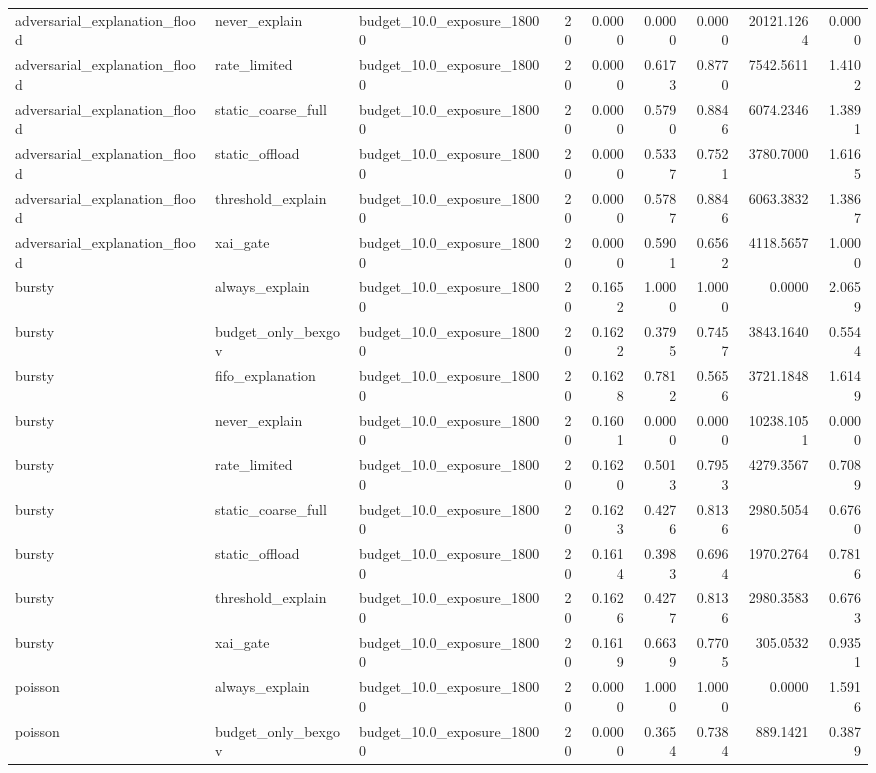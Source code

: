 \begin{table}[t]
\begin{tabular}{lllrrrrrr}
adversarial\_explanation\_flood & never\_explain & budget\_10.0\_exposure\_18000 & 20 & 0.0000 & 0.0000 & 0.0000 & 20121.1264 & 0.0000 \\
adversarial\_explanation\_flood & rate\_limited & budget\_10.0\_exposure\_18000 & 20 & 0.0000 & 0.6173 & 0.8770 & 7542.5611 & 1.4102 \\
adversarial\_explanation\_flood & static\_coarse\_full & budget\_10.0\_exposure\_18000 & 20 & 0.0000 & 0.5790 & 0.8846 & 6074.2346 & 1.3891 \\
adversarial\_explanation\_flood & static\_offload & budget\_10.0\_exposure\_18000 & 20 & 0.0000 & 0.5337 & 0.7521 & 3780.7000 & 1.6165 \\
adversarial\_explanation\_flood & threshold\_explain & budget\_10.0\_exposure\_18000 & 20 & 0.0000 & 0.5787 & 0.8846 & 6063.3832 & 1.3867 \\
adversarial\_explanation\_flood & xai\_gate & budget\_10.0\_exposure\_18000 & 20 & 0.0000 & 0.5901 & 0.6562 & 4118.5657 & 1.0000 \\
bursty & always\_explain & budget\_10.0\_exposure\_18000 & 20 & 0.1652 & 1.0000 & 1.0000 & 0.0000 & 2.0659 \\
bursty & budget\_only\_bexgov & budget\_10.0\_exposure\_18000 & 20 & 0.1622 & 0.3795 & 0.7457 & 3843.1640 & 0.5544 \\
bursty & fifo\_explanation & budget\_10.0\_exposure\_18000 & 20 & 0.1628 & 0.7812 & 0.5656 & 3721.1848 & 1.6149 \\
bursty & never\_explain & budget\_10.0\_exposure\_18000 & 20 & 0.1601 & 0.0000 & 0.0000 & 10238.1051 & 0.0000 \\
bursty & rate\_limited & budget\_10.0\_exposure\_18000 & 20 & 0.1620 & 0.5013 & 0.7953 & 4279.3567 & 0.7089 \\
bursty & static\_coarse\_full & budget\_10.0\_exposure\_18000 & 20 & 0.1623 & 0.4276 & 0.8136 & 2980.5054 & 0.6760 \\
bursty & static\_offload & budget\_10.0\_exposure\_18000 & 20 & 0.1614 & 0.3983 & 0.6964 & 1970.2764 & 0.7816 \\
bursty & threshold\_explain & budget\_10.0\_exposure\_18000 & 20 & 0.1626 & 0.4277 & 0.8136 & 2980.3583 & 0.6763 \\
bursty & xai\_gate & budget\_10.0\_exposure\_18000 & 20 & 0.1619 & 0.6639 & 0.7705 & 305.0532 & 0.9351 \\
poisson & always\_explain & budget\_10.0\_exposure\_18000 & 20 & 0.0000 & 1.0000 & 1.0000 & 0.0000 & 1.5916 \\
poisson & budget\_only\_bexgov & budget\_10.0\_exposure\_18000 & 20 & 0.0000 & 0.3654 & 0.7384 & 889.1421 & 0.3879 \\

\end{tabular}
\end{table}
